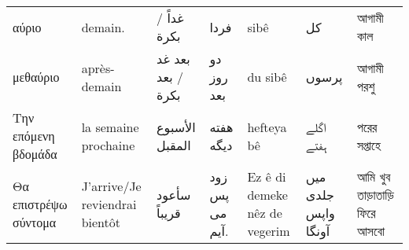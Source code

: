 \begin{longtable}{p{3.5cm} p{3.5cm} p{3.5cm} p{3.5cm} p{3.5cm} p{3.5cm} p{3.5cm} }
 αύριο                                                                                                                         & demain.                                                                                         & غداً                    / بكرة                                                        & فردا                                                        & sibê                                                                               & کل                                                                             & আগামী কাল                                                         \\
 μεθαύριο                                                                                                                      & après-demain                                                                                    & بعد غد       /             بعد بكرة                                                   & دو روز بعد                                                  & du sibê                                                                            & پرسوں                                                                          & আগামী পরশু                                                        \\
 Την επόμενη βδομάδα                                                                                                           & la semaine prochaine                                                                            & الأسبوع المقبل                                                                        & هفته دیگه                                                   & hefteya bê                                                                         & اگلے ہفتے                                                                      & পরের সপ্তাহে                                                      \\
 Θα επιστρέψω σύντομα                                                                                                          & J'arrive/Je reviendrai bientôt                                                                  & سأعود قريباً                                                                          & زود پس می آیم.                                              & Ez ê di demeke nêz de vegerim                                                      & میں جلدی واپس آونگا                                                           & আমি খুব তাড়াতাড়ি ফিরে আসবো                                        \\

\end{longtable}
